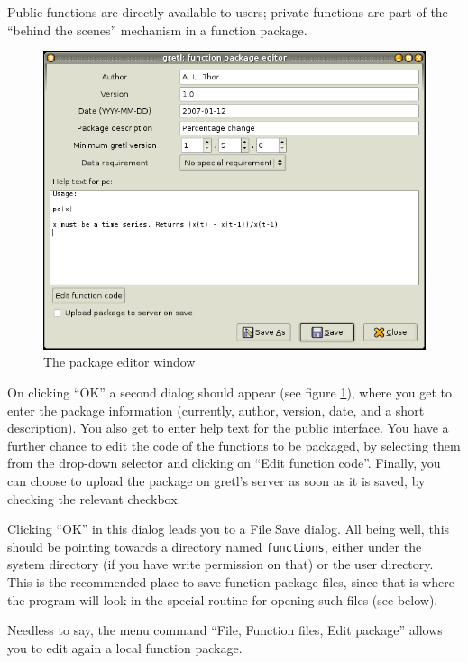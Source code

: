 Public functions are directly available to users; private functions are
part of the ``behind the scenes'' mechanism in a function package.

\begin{figure}[htbp]
  \centering
  \includegraphics[scale=0.5]{figures/package_editor}
  \caption{The package editor window}
  \label{fig:package_editor}
\end{figure}

On clicking ``OK'' a second dialog should appear (see figure
\ref{fig:package_editor}), where you get to enter the package
information (currently, author, version, date, and a short
description).  You also get to enter help text for the public
interface.  You have a further chance to edit the code of the
functions to be packaged, by selecting them from the drop-down
selector and clicking on ``Edit function code''. Finally, you can
choose to upload the package on gretl's server as soon as it is saved,
by checking the relevant checkbox.

Clicking ``OK'' in this dialog leads you to a File Save dialog.  All
being well, this should be pointing towards a directory named
\texttt{functions}, either under the  system directory (if
you have write permission on that) or the  user directory.
This is the recommended place to save function package files, since
that is where the program will look in the special routine for opening
such files (see below).

Needless to say, the menu command ``File, Function files, Edit package''
allows you to edit again a local function package.

